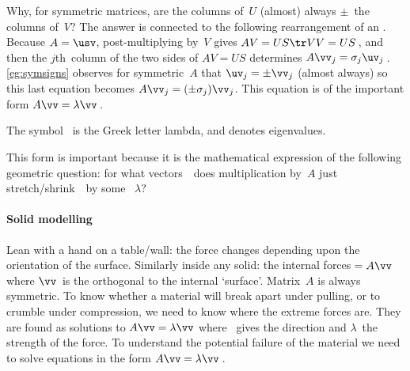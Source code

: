 Why, for symmetric matrices, are the columns of~\(U\) (almost) always \(\pm\)~the columns of~\(V\)?
The answer is connected to the following rearrangement of an \svd.  
Because \(A=\usv\), post-multiplying by~\(V\) gives \(AV=US\tr VV=US\)\,, and then the \(j\)th~column of the two sides of \(AV=US\) determines \(A\vv_j=\sigma_j\uv_j\)\,.
\autoref{eg:symsigns} observes for symmetric~\(A\) that \(\uv_j=\pm\vv_j\) (almost always) so this last equation becomes \(A\vv_j=(\pm \sigma_j)\vv_j\).
This equation is of the important form \(A\vv=\lambda\vv\)\,.
\begin{aside}
The symbol~\bfidx{$\lambda$} is the Greek letter lambda, and denotes eigenvalues.
\end{aside}%
This form is important because it is the mathematical expression of the following geometric question: for what vectors~\vv\ does multiplication by~\(A\) just stretch\slash shrink~\vv\ by some ~\(\lambda\)?

\begin{comment}
Dynamics of two masses on a spring (relate to molecular vibrations), and seek solutions in~\(\cos(ft)\) for eigenvalue \(\lambda=f^2\).  
As done for three masses in \autoref{eg:eig3vib}.  Say symmetry from equal and opposite, claim holds even for gigantic structures with millions of interacting components.
\end{comment}


\paragraph{Solid modelling} Lean with a hand on a table\slash wall: the force changes depending upon the orientation of the surface.  
Similarly inside any solid: the internal forces\({}=A\vv\) where \(\vv\)~is the orthogonal  to the internal `surface'.  
Matrix~\(A\) is always symmetric.  
To know whether a material will break apart under pulling, or to crumble under compression,  we need to know where the extreme forces are.  
They are found as solutions to \(A\vv=\lambda\vv\) where \vv~gives the direction and \(\lambda\)~the strength of the force.
To understand the potential failure of the material we need to solve equations in the form \(A\vv=\lambda\vv\)\,.




\endinput

